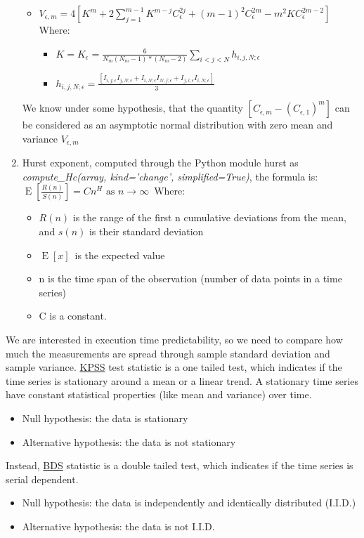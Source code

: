 \begin{enumerate}
\begin{itemize}
		\item $V_{\epsilon,m} = 4[{K}^{m} + 2\sum_{j=1}^{m-1}{K}^{m-j}{C}^{2j}_\epsilon + {(m-1)}^{2}{C}^{2m}_\epsilon - {m}^{2}K{C}^{2m-2}_\epsilon]$
		Where:
		\begin{itemize}
			\item $K=K_\epsilon = \frac{6}{N_m(N_m-1)*(N_m-2)}\sum_{i<j<N}h_{i,j,N;\epsilon}$
			\item $h_{i,j,N;\epsilon} = \frac{[I_{i,j;\epsilon}I_{j,N;\epsilon}+I_{i,N;\epsilon}I_{N,j;\epsilon}+I_{j,i;\epsilon}I_{i,N;\epsilon}]}{3}$
		\end{itemize}
	\end{itemize}
	We know under some hypothesis, that the quantity $[C_{\epsilon,m}-{(C_{\epsilon,1})}^{m}]$ can be considered as an asymptotic normal distribution with zero mean and variance $V_{\epsilon,m}$
	\item Hurst exponent, computed through the Python module hurst as \textit{compute\_Hc(array, kind='change', simplified=True)}, the formula is:\newline
	$\operatorname{E} \left [ \frac{R(n)}{S(n)} \right ]=C n^H  \text{  as } n \to \infty  \, $
	\newline Where:
	\begin{itemize}
		\item $R(n)$ is the range of the first n cumulative deviations from the mean, and $s(n)$ is their standard deviation
		\item $\operatorname{E} \left [x \right ] \,$ is the expected value
		\item n is the time span of the observation (number of data points in a time series)
		\item C is a constant.
	\end{itemize}
\end{enumerate}

We are interested in execution time predictability, so we need to compare how much the measurements are spread through sample standard deviation and sample variance.
\href{http://debis.deu.edu.tr/userweb//onder.hanedar/dosyalar/kpss.pdf}{KPSS} test statistic is a one tailed test, which indicates if the time series is stationary around a mean or a linear trend. A stationary time series have constant statistical properties (like mean and variance) over time.
\begin{itemize}
	\item Null hypothesis: the data is stationary
	\item Alternative hypothesis: the data is not stationary
\end{itemize}
Instead, \href{https://www.researchgate.net/publication/46554708_A_Fast_Algorithm_for_the_BDS_Statistic}{BDS} statistic is a double tailed test, which indicates if the time series is serial dependent.
\begin{itemize}
 	\item Null hypothesis: the data is independently and identically distributed (I.I.D.)
 	\item Alternative hypothesis: the data is not I.I.D.
\end{itemize}

